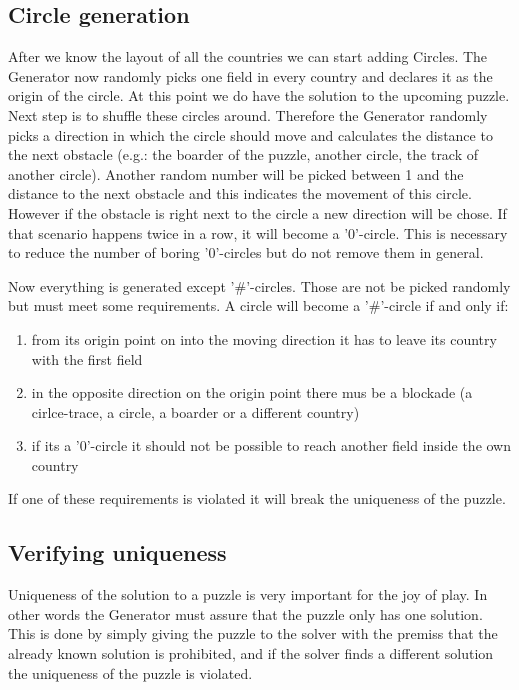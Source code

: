 \documentclass[a4paper,10pt]{paper}
\begin{document}
\subsection{Circle generation}
After we know the layout of all the countries we can start adding Circles. The Generator now randomly picks one field in every country and declares it as the origin of the circle. At this point we do have the solution to the upcoming puzzle. Next step is to shuffle these circles around.
Therefore the Generator randomly picks a direction in which the circle should move and calculates the distance to the next obstacle (e.g.: the boarder of the puzzle, another circle, the track of another circle). Another random number will be picked between 1 and the distance to the next obstacle and this indicates the movement of this circle. 
However if the obstacle is right next to the circle a new direction will be chose. If that scenario happens twice in a row, it will become a '0'-circle. This is necessary to reduce the number of boring '0'-circles but do not remove them in general.

Now everything is generated except '\#'-circles. Those are not be picked randomly but must meet some requirements. A circle will become a '\#'-circle if and only if:
\begin{enumerate}
  \item from its origin point on into the moving direction it has to leave its country with the first field
  \item in the opposite direction on the origin point there mus be a blockade (a cirlce-trace, a circle, a boarder or a different country)
  \item if its a '0'-circle it should not be possible to reach another field inside the own country
\end{enumerate}
If one of these requirements is violated it will break the uniqueness of the puzzle.

\subsection{Verifying uniqueness}
Uniqueness of the solution to a puzzle is very important for the joy of play. In other words the Generator must assure that the puzzle only has one solution. This is done by simply giving the puzzle to the solver with the premiss that the already known solution is prohibited, and if the solver finds a different solution the uniqueness of the puzzle is violated.
\end{document}
